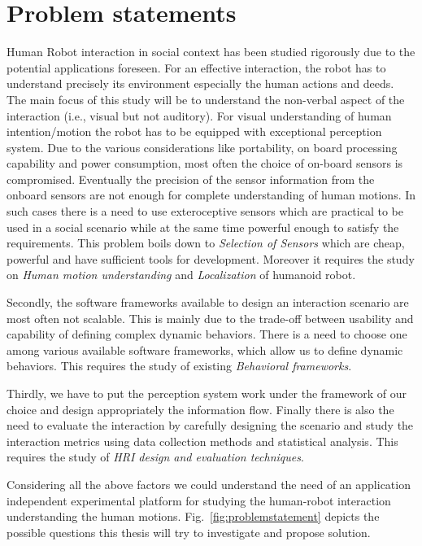 \section{Problem statements}
\label{sec:problem_statement}
	Human Robot interaction in social context has been studied rigorously due to the potential applications foreseen. For an effective interaction, the robot has to understand precisely its environment especially the human actions and deeds. The main focus of this study will be to understand the non-verbal aspect of the interaction (i.e., visual but not auditory). For visual understanding of human intention/motion the robot has to be equipped with exceptional perception system. Due to the various considerations like portability, on board processing capability and power consumption, most often the choice of on-board sensors is compromised. Eventually the precision of the sensor information from the onboard sensors are not enough for complete understanding of human motions. In such cases there is a need to use exteroceptive sensors which are practical to be used in a social scenario while at the same time powerful enough to satisfy the requirements. This problem boils down to \emph{Selection of Sensors} which are cheap, powerful and have sufficient tools for development. Moreover it requires the study on \emph{Human motion understanding} and \emph{Localization} of humanoid robot.
	
	Secondly, the software frameworks available to design an interaction scenario are most often not scalable. This is mainly due to the trade-off between usability and capability of defining complex dynamic behaviors. There is a need to choose one among various available software frameworks, which allow us to define dynamic behaviors. This requires the study of existing \emph{Behavioral frameworks}.

	Thirdly, we have to put the perception system work under the framework of our choice and design appropriately the information flow. Finally there is also the need to evaluate the interaction by carefully designing the scenario and study the interaction metrics using data collection methods and statistical analysis. This requires the study of \emph{HRI design and evaluation techniques}.

	Considering all the above factors we could understand the need of an application independent experimental platform for studying the human-robot interaction understanding the human motions. Fig.~\ref{fig:problemstatement} depicts the possible questions this thesis will try to investigate and propose solution. 

